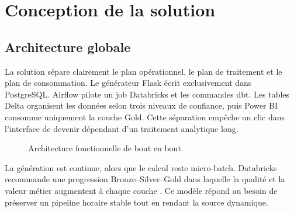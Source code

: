 \chapter{Conception de la solution}

\section{Architecture globale}
La solution sépare clairement le plan opérationnel, le plan de traitement et le plan de consommation. Le générateur Flask écrit exclusivement dans PostgreSQL. Airflow pilote un job Databricks et les commandes dbt. Les tables Delta organisent les données selon trois niveaux de confiance, puis Power BI consomme uniquement la couche Gold. Cette séparation empêche un clic dans l'interface de devenir dépendant d'un traitement analytique long.

\begin{figure}[htbp]
\centering
{}
\caption{Architecture fonctionnelle de bout en bout}
\label{fig:architecture}
\end{figure}

La génération est continue, alors que le calcul reste micro-batch. Databricks recommande une progression Bronze--Silver--Gold dans laquelle la qualité et la valeur métier augmentent à chaque couche \cite{databricks-medallion}. Ce modèle répond au besoin de préserver un pipeline horaire stable tout en rendant la source dynamique.

